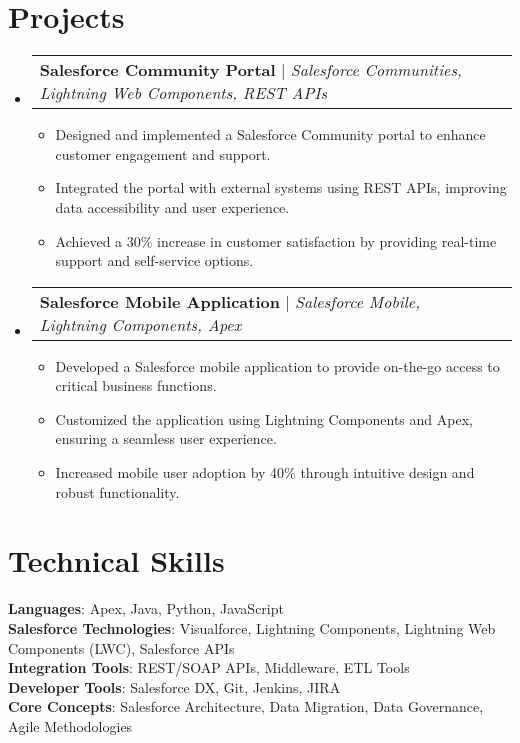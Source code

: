 \documentclass{article}
\makeatletter
\newcommand{\resumeItem}[1]{
  \item\small{
    {#1 \vspace{-2pt}}
  }
}
\newcommand{\resumeProjectHeading}[2]{
    \item
    \begin{tabular*}{0.97\textwidth}{l@{\extracolsep{\fill}}r}
      \small#1 & #2 \\
    \end{tabular*}\vspace{-7pt}
}
\newcommand{\resumeSubHeadingListStart}{\begin{itemize}[leftmargin=0.15in, label={}]}
\newcommand{\resumeSubHeadingListEnd}{\end{itemize}}
\newcommand{\resumeItemListStart}{\begin{itemize}}
\newcommand{\resumeItemListEnd}{\end{itemize}\vspace{-5pt}}
\makeatother
\begin{document}
\section{Projects}
\resumeSubHeadingListStart
\resumeProjectHeading
{\textbf{Salesforce Community Portal} $|$ \emph{Salesforce Communities, Lightning Web Components, REST APIs}}{}
\resumeItemListStart
\resumeItem{Designed and implemented a Salesforce Community portal to enhance customer engagement and support.}
\resumeItem{Integrated the portal with external systems using REST APIs, improving data accessibility and user experience.}
\resumeItem{Achieved a 30\% increase in customer satisfaction by providing real-time support and self-service options.}
\resumeItemListEnd
\resumeProjectHeading
{\textbf{Salesforce Mobile Application} $|$ \emph{Salesforce Mobile, Lightning Components, Apex}}{}
\resumeItemListStart
\resumeItem{Developed a Salesforce mobile application to provide on-the-go access to critical business functions.}
\resumeItem{Customized the application using Lightning Components and Apex, ensuring a seamless user experience.}
\resumeItem{Increased mobile user adoption by 40\% through intuitive design and robust functionality.}
\resumeItemListEnd
\resumeSubHeadingListEnd




%
\section{Technical Skills}
\begin{itemize}[leftmargin=0.15in, label={}]
\small{\item{
\textbf{Languages}: Apex, Java, Python, JavaScript \\
\textbf{Salesforce Technologies}: Visualforce, Lightning Components, Lightning Web Components (LWC), Salesforce APIs \\
\textbf{Integration Tools}: REST/SOAP APIs, Middleware, ETL Tools \\
\textbf{Developer Tools}: Salesforce DX, Git, Jenkins, JIRA \\
\textbf{Core Concepts}: Salesforce Architecture, Data Migration, Data Governance, Agile Methodologies
}}
\end{itemize}



\end{document}
